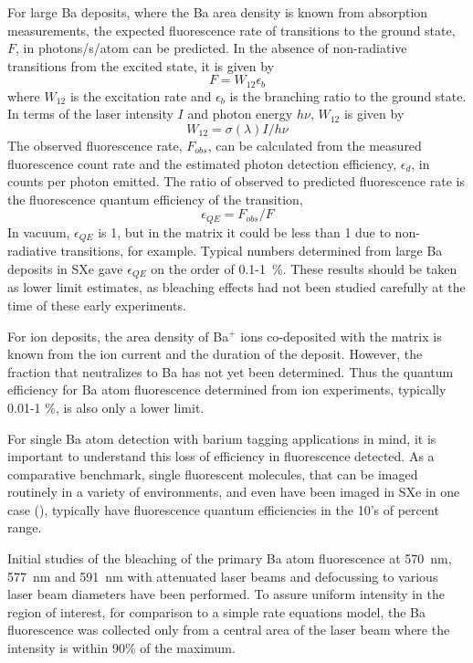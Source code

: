 \documentclass[aps,pra,reprint,superscriptaddress]{revtex4-1}
\begin{document}
For large Ba deposits, where the Ba area density is known from absorption measurements, the expected fluorescence rate of transitions to the ground state, $F$, in photons/s/atom can be predicted.
In the absence of non-radiative transitions from the excited state, it is given by
\begin{equation}
F = W_{12} \epsilon _b
\end{equation}
where $W_{12}$ is the excitation rate and $\epsilon_b$ is the branching ratio to the ground state.
In terms of the laser intensity $I$ and photon energy $h\nu$, $W_{12}$ is given by
\begin{equation}
W_{12}= \sigma(\lambda) I/h\nu
\end{equation}
The observed fluorescence rate, $F_{obs}$, can be calculated from the measured fluorescence count rate and the estimated photon detection efficiency, $\epsilon_d$, in counts per photon emitted.
The ratio of observed to predicted fluorescence rate is the fluorescence quantum efficiency of the transition,
\begin{equation}
\epsilon_{QE}=F_{obs}/F
\end{equation}
In vacuum, $\epsilon_{QE}$ is 1, but in the matrix it could be less than 1 due to non-radiative transitions, for example.
Typical numbers determined from large Ba deposits in SXe gave $\epsilon_{QE}$ on the order of 0.1-1~\%.  These results should be taken as lower limit estimates, as bleaching effects had not been studied carefully at the time of these early experiments.

For ion deposits, the area density of Ba$^+$ ions co-deposited with the matrix is known from the ion current and the duration of the deposit.  
However, the fraction that neutralizes to Ba has not yet been determined.  
Thus the quantum efficiency for Ba atom fluorescence determined from ion experiments, typically 0.01-1 \%, is also only a lower limit.

For single Ba atom detection with barium tagging applications in mind, it is important to understand this loss of efficiency in fluorescence detected.
As a comparative benchmark, single fluorescent molecules, that can be imaged routinely in a variety of environments, and even have been imaged in SXe in one case (\cite{Sepiol1999}), typically have fluorescence quantum efficiencies in the 10's of percent range.

Initial studies of the bleaching of the primary Ba atom fluorescence at 570~nm, 577~nm and 591~nm  with attenuated laser beams and defocussing to various laser beam diameters have been performed.
To assure uniform intensity in the region of interest, for comparison to a simple rate equations model, the Ba fluorescence was collected only from a central area of the laser beam where the intensity is within 90\% of the maximum.
\end{document}
